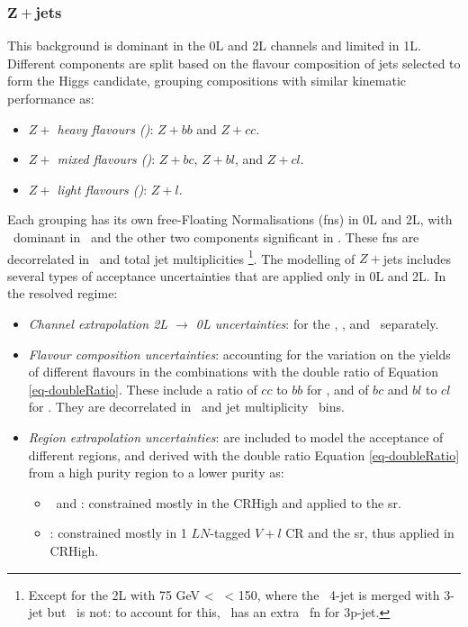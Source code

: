 \subsubsection{$\boldsymbol{Z+}$jets}
This background is dominant in the 0L and 2L channels and limited in 1L. Different components are split based on the flavour composition of jets selected to form the Higgs candidate, grouping compositions with similar kinematic performance as:   
\begin{itemize}
    \item \textit{$Z+$ heavy flavours (\zhf)}: $Z+bb$ and $Z+cc$.
    \item \textit{$Z+$ mixed flavours (\zmf)}: $Z+bc$, $Z+bl$, and $Z+cl$.
    \item \textit{$Z+$ light flavours (\zlf)}: $Z+l$.
\end{itemize}
Each grouping has its own free-Floating Normalisations (\glspl{fn}) in 0L and 2L, with \zhf\ dominant in \vhb\ and the other two components significant in \vhc. These \glspl{fn} are decorrelated in \ptv\ and total jet multiplicities \nj\footnote{Except for the 2L with 75 GeV < \ptv\ < 150, where the \vhb\ 4-jet is merged with 3-jet but \vhc\ is not: to account for this, \vhb\ has an extra \zhf\ \gls{fn} for 3p-jet.}. The modelling of $Z+$jets includes several types of acceptance uncertainties that are applied only in 0L and 2L. In the resolved regime:
\begin{itemize}[leftmargin=*]
    \item \textit{Channel extrapolation 2L $\rightarrow$ 0L uncertainties}: for the \zhf, \zmf, and \zlf\ separately. 
    \item \textit{Flavour composition uncertainties}: accounting for the variation on the yields of different flavours in the combinations with the double ratio of Equation \ref{eq-doubleRatio}. These include a ratio of $cc$ to $bb$ for \zhf, and of $bc$ and $bl$ to $cl$ for \zmf. They are decorrelated in \ptv\ and jet multiplicity \nj\ bins. 
    \item \textit{Region extrapolation uncertainties}: are included to model the acceptance of different regions, and derived with the double ratio Equation \ref{eq-doubleRatio} from a high purity region to a lower purity as:
    \begin{itemize}
        \item \zhf\ and \zmf: constrained mostly in the CRHigh and applied to the \gls{sr}. 
        \item \zlf: constrained mostly in 1 $LN$-tagged $V+l$ CR and the \gls{sr}, thus applied in CRHigh. %
    \end{itemize}
\end{itemize}
